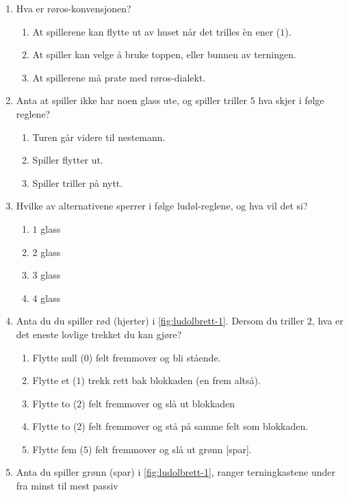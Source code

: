 \documentclass[10pt,a4paper,norsk,openany]{book}
\begin{document}
\begin{enumerate}
  \item Hva er røros-konvensjonen? 
    \begin{enumerate}
      \item At spillerene kan flytte ut av huset når det trilles èn ener ($1$).
      \item At spiller kan velge å bruke toppen, eller bunnen av terningen.
      \item At spillerene må prate med røros-dialekt.
    \end{enumerate}
  \item Anta at spiller ikke har noen glass ute, og spiller triller $5$ hva
    skjer i følge reglene? 
    \begin{enumerate}
    \item Turen går videre til nestemann.
    \item Spiller flytter ut.
    \item Spiller triller på nytt. 
    \end{enumerate}
  \item \label{punkt:sperrer} Hvilke av alternativene sperrer i følge ludøl-reglene, og hva vil
    det si?
    \begin{enumerate}
      \item $1$ glass
      \item $2$ glass
      \item $3$ glass
      \item $4$ glass
    \end{enumerate}
  \item Anta du du spiller rød (hjerter) i \cref{fig:ludolbrett-1}. Dersom du
    triller $2$, hva er det eneste lovlige trekket du kan gjøre?
    \begin{enumerate}
      \item Flytte null ($0$) felt fremmover og bli stående.
      \item Flytte et ($1$) trekk rett bak blokkaden (en frem altså).
      \item Flytte to ($2$) felt fremmover og slå ut blokkaden
      \item Flytte to ($2$) felt fremmover og stå på samme felt som blokkaden.
      \item Flytte fem
        ($5$) felt fremmover og slå ut grønn [spar].
    \end{enumerate}
  \item Anta du spiller grønn (spar) i \cref{fig:ludolbrett-1}, ranger
    terningkastene under fra minst til mest passiv

\end{enumerate}
\end{document}
